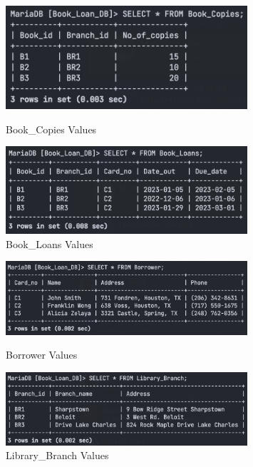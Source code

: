 \documentclass{article}
\begin{document}
\begin{figure}[h!]
    \begin{minipage}[b]{0.5\linewidth}
        \centering
        \includegraphics[width=0.8\textwidth]{images/table-book-copies-entries.png}
        \caption{Book\_Copies Values}
        \label{fig:table-book-copies}
    \end{minipage}
    \hspace{0.5cm}
    \begin{minipage}[b]{0.5\linewidth}
        \centering
        \includegraphics[width=0.8\textwidth]{images/table-book-loans-entries.png}
        \caption{Book\_Loans Values}
        \label{fig:table-book-loans}
    \end{minipage}
    
\end{figure}

\begin{figure}[h!]
    \begin{minipage}[b]{0.5\linewidth}
        \centering
        \includegraphics[width=0.8\textwidth]{images/table-borrower-entries.png}
        \caption{Borrower Values}
        \label{fig:table-borrower}
    \end{minipage}
    \hspace{0.5cm}
    \begin{minipage}[b]{0.5\linewidth}
        \centering
        \includegraphics[width=0.8\textwidth]{images/table-library-branch-entries.png}
        \caption{Library\_Branch Values}
        \label{fig:table-library-branch}
    \end{minipage}
\end{figure}
\end{document}
